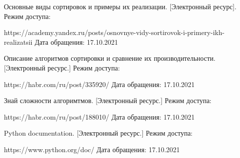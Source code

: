 \documentclass[12pt]{report}
\begin{document}



\begin{thebibliography}{9}
	 Основные виды сортировок и примеры их реализации. [Электронный ресурс]. Режим доступа: 
	
	https://academy.yandex.ru/posts/osnovnye-vidy-sortirovok-i-primery-ikh-realizatsii
	{Дата обращения: 17.10.2021}
	
	 Описание алгоритмов сортировки и сравнение их производительности. [Электронный ресурс.] Режим доступа:
	
	https://habr.com/ru/post/335920/
	{Дата обращения: 17.10.2021}
	
	 Знай сложности алгоримтмов. [Электронный ресурс.] Режим доступа:
	
	https://habr.com/ru/post/188010/
	{Дата обращения: 17.10.2021}
	
	 Python documentation. [Электронный ресурс.] Режим доступа:
	
	https://www.python.org/doc/
	{Дата обращения: 17.10.2021}
\end{thebibliography}
\end{document}
